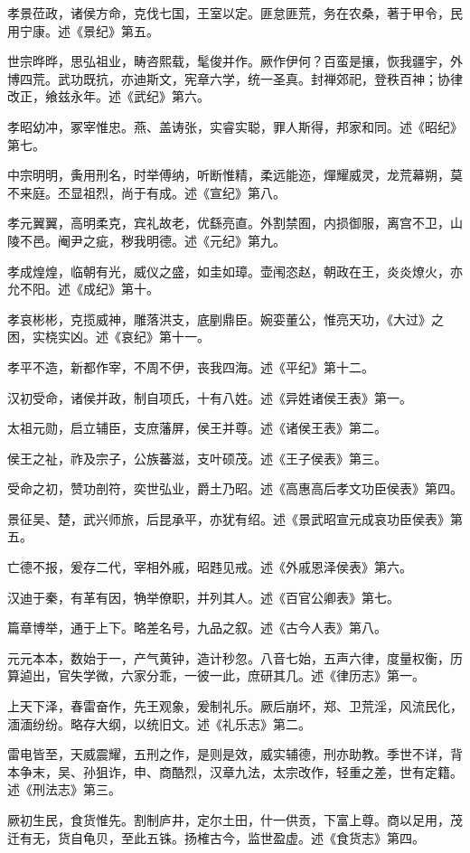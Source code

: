 \documentclass[]{article}
\begin{document}
孝景莅政，诸侯方命，克伐七国，王室以定。匪怠匪荒，务在农桑，著于甲令，民用宁康。述《景纪》第五。

世宗晔晔，思弘祖业，畴咨熙载，髦俊并作。厥作伊何？百蛮是攘，恢我疆宇，外博四荒。武功既抗，亦迪斯文，宪章六学，统一圣真。封禅郊祀，登秩百神；协律改正，飨兹永年。述《武纪》第六。

孝昭幼冲，冢宰惟忠。燕、盖诪张，实睿实聪，罪人斯得，邦家和同。述《昭纪》第七。

中宗明明，夤用刑名，时举傅纳，听断惟精，柔远能迩，燀耀威灵，龙荒幕朔，莫不来庭。丕显祖烈，尚于有成。述《宣纪》第八。

孝元翼翼，高明柔克，宾礼故老，优繇亮直。外割禁囿，内损御服，离宫不卫，山陵不邑。阉尹之疵，秽我明德。述《元纪》第九。

孝成煌煌，临朝有光，威仪之盛，如圭如璋。壶闱恣赵，朝政在王，炎炎燎火，亦允不阳。述《成纪》第十。

孝哀彬彬，克揽威神，雕落洪支，底剭鼎臣。婉娈董公，惟亮天功，《大过》之困，实桡实凶。述《哀纪》第十一。

孝平不造，新都作宰，不周不伊，丧我四海。述《平纪》第十二。

汉初受命，诸侯并政，制自项氏，十有八姓。述《异姓诸侯王表》第一。

太祖元勋，启立辅臣，支庶藩屏，侯王并尊。述《诸侯王表》第二。

侯王之祉，祚及宗子，公族蕃滋，支叶硕茂。述《王子侯表》第三。

受命之初，赞功剖符，奕世弘业，爵土乃昭。述《高惠高后孝文功臣侯表》第四。

景征吴、楚，武兴师旅，后昆承平，亦犹有绍。述《景武昭宣元成哀功臣侯表》第五。

亡德不报，爰存二代，宰相外戚，昭韪见戒。述《外戚恩泽侯表》第六。

汉迪于秦，有革有因，觕举僚职，并列其人。述《百官公卿表》第七。

篇章博举，通于上下。略差名号，九品之叙。述《古今人表》第八。

元元本本，数始于一，产气黄钟，造计秒忽。八音七始，五声六律，度量权衡，历算逌出，官失学微，六家分乖，一彼一此，庶研其几。述《律历志》第一。

上天下泽，春雷奋作，先王观象，爰制礼乐。厥后崩坏，郑、卫荒淫，风流民化，湎湎纷纷。略存大纲，以统旧文。述《礼乐志》第二。

雷电皆至，天威震耀，五刑之作，是则是效，威实辅德，刑亦助教。季世不详，背本争末，吴、孙狙诈，申、商酷烈，汉章九法，太宗改作，轻重之差，世有定籍。述《刑法志》第三。

厥初生民，食货惟先。割制庐井，定尔土田，什一供贡，下富上尊。商以足用，茂迁有无，货自龟贝，至此五铢。扬榷古今，监世盈虚。述《食货志》第四。
\end{document}
